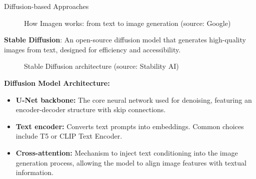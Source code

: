 \begin{frame}[allowframebreaks]{Diffusion-based Approaches}
    \begin{figure}
        \centering
        \caption*{How Imagen works: from text to image generation (source: Google)}
    \end{figure}
\framebreak
    \begin{figure}
        \centering
    \end{figure}
\framebreak
    \textbf{Stable Diffusion}: An open-source diffusion model that generates high-quality images from text, designed for efficiency and accessibility.
    \begin{figure}
        \centering
        \caption*{Stable Diffusion architecture (source: Stability AI)}
    \end{figure}
\framebreak
    \begin{figure}
        \centering
    \end{figure}
\framebreak
    \textbf{Diffusion Model Architecture:}
    \begin{itemize}
        \item \textbf{U-Net backbone:} The core neural network used for denoising, featuring an encoder-decoder structure with skip connections.
        \item \textbf{Text encoder:} Converts text prompts into embeddings. Common choices include T5 or CLIP Text Encoder.
        \item \textbf{Cross-attention:} Mechanism to inject text conditioning into the image generation process, allowing the model to align image features with textual information.
    \end{itemize}
\end{frame}